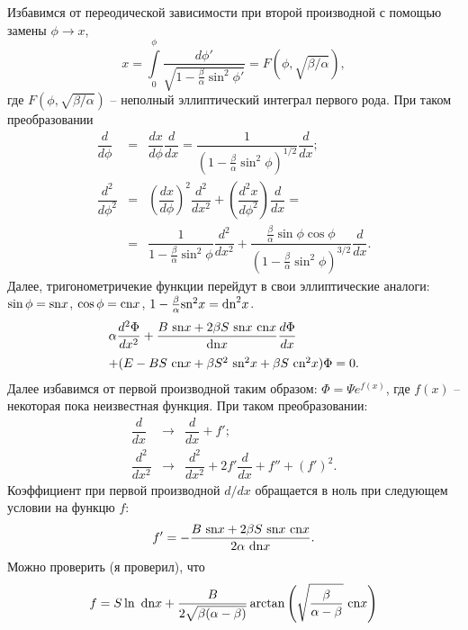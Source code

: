\documentclass[12pt]{article}
\begin{document}
Избавимся от переодической зависимости при второй производной с помощью замены $\phi \to x$,
%
\begin{equation*}
x = \int \limits_0^\phi \dfrac{d \phi'}{\sqrt{1 - \frac{\beta}{\alpha} \sin^2 \phi'}} = F(\phi, \sqrt{\beta / \alpha}),
\end{equation*}
%
где $F(\phi, \sqrt{\beta / \alpha})$ -- неполный эллиптический интеграл первого рода.
При таком преобразовании
%
\begin{eqnarray*}
\dfrac{d}{d \phi} & = & \dfrac{dx}{d \phi} \dfrac{d}{dx} =  \dfrac{1}{(1 - \frac{\beta}{\alpha} \sin^2 \phi)^{1/2}} \dfrac{d}{dx};\\
\dfrac{d^2}{d \phi^2} & = & \left( \dfrac{dx}{d\phi} \right)^2 \dfrac{d^2}{dx^2} + \left( \dfrac{d^2 x}{d \phi^2} \right) \dfrac{d}{dx} = \\
& = & \dfrac{1}{1 - \frac{\beta}{\alpha} \sin^2 \phi} \dfrac{d^2}{dx^2} + \dfrac{\frac{\beta}{\alpha} \sin \phi \cos \phi}{(1 - \frac{\beta}{\alpha} \sin^2 \phi)^{3/2}} \dfrac{d}{dx}.
\end{eqnarray*}
%
Далее, тригонометричекие функции перейдут в свои эллиптические аналоги: $\sin \phi = \textrm{sn} x$, $\cos \phi = \textrm{cn} x$, $1 - \frac{\beta}{\alpha} \textrm{sn}^2 x = \textrm{dn}^2 x$.
%
\begin{equation}
\begin{array}{l}
	\alpha \dfrac{d^2 \Phi}{d x^2} + \dfrac{B~\textrm{sn} x + 2 \beta S~\textrm{sn} x~\textrm{cn} x}{\textrm{dn} x} \dfrac{d \Phi}{dx} \\[10pt]
	+ (E - BS~\textrm{cn} x + \beta S^2~\textrm{sn}^2 x + \beta S~\textrm{cn}^2 x) \Phi = 0.
\end{array}
\end{equation}
%
Далее избавимся от первой производной таким образом: $\Phi = \Psi e^{f(x)}$, где $f(x)$ -- некоторая пока неизвестная функция.
При таком преобразовании:
%
\begin{equation*}
\begin{array}{lcl}
	\dfrac{d}{dx} & \to & \dfrac{d}{dx} + f';\\[10pt]
	\dfrac{d^2}{dx^2} & \to & \dfrac{d^2}{dx^2} + 2f' \dfrac{d}{dx} + f'' + (f')^2.
\end{array}
\end{equation*}
%
Коэффициент при первой производной $d/dx$ обращается в ноль при следующем условии на функцю $f$:
%
\begin{equation}
f' = -\dfrac{B~\textrm{sn} x + 2 \beta S~\textrm{sn} x~\textrm{cn} x}{2 \alpha~\textrm{dn} x}.
\label{eq:f_condition}
\end{equation}
%
Можно проверить (я проверил), что
%
\begin{equation}
f = S \ln~\textrm{dn} x + \frac{B}{2 \sqrt{\beta(\alpha - \beta)}} \arctan \left( \sqrt{\frac{\beta}{\alpha - \beta}}~\textrm{cn} x \right)
\end{equation}
\end{document}
